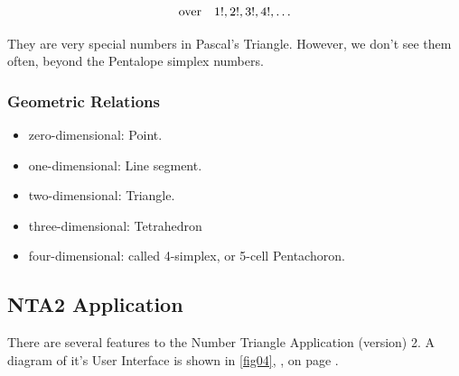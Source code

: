 \documentclass[12pt]{article}
\begin{document}
        \begin{equation}
        \label{eq1:5}
            \rm{over}\quad 1!, 2!, 3!, 4!, \ldots
        \end{equation}
               
        They are very special numbers in Pascal's Triangle. However, we don't see them often, 
        beyond the Pentalope simplex numbers.
        
        \subsubsection{Geometric Relations}
        \label{secb:13}
        
        \begin{itemize}
            \item zero-dimensional: Point.
            \item one-dimensional: Line segment.
            \item two-dimensional: Triangle.
            \item three-dimensional: Tetrahedron
            \item four-dimensional: called 4-simplex, or 5-cell Pentachoron.
        \end{itemize}


    \subsection{NTA2 Application}
    \label{sec:13b}
    
    There are several features to the Number Triangle Application (version) 2.
    A diagram of it's User Interface is shown in \cref{fig04}, , on page 
    \pageref{fig04}.
    
\end{document}
